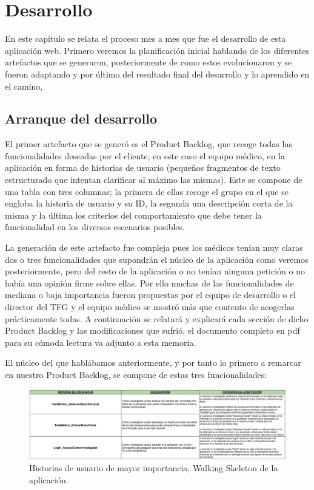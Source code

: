 \chapter{Desarrollo}

En este capitulo se relata el proceso mes a mes que fue el desarrollo de esta aplicación web. Primero veremos la planificación inicial hablando de los diferentes artefactos que se generaron, posteriormente de como estos evolucionaron y se fueron adaptando y por último del resultado final del desarrollo y lo aprendido en el camino,

\section{Arranque del desarrollo}

El primer artefacto que se generó es el Product Backlog, que recoge todas las funcionalidades deseadas por el cliente, en este caso el equipo médico, en la aplicación en forma de historias de usuario (pequeños fragmentos de texto estructurado que intentan clarificar al máximo las mismas). Este se compone de una tabla con tres columnas; la primera de ellas recoge el grupo en el que se engloba la historia de usuario y su ID, la segunda una descripción corta de la misma y la última los criterios del comportamiento que debe tener la funcionalidad en los diversos escenarios posibles.
\newline

La generación de este artefacto fue compleja pues los médicos tenían muy claras dos o tres funcionalidades que supondrán el núcleo de la aplicación como veremos posteriormente, pero del resto de la aplicación o no tenían ninguna petición o no había una opinión firme sobre ellas. Por ello muchas de las funcionalidades de mediana o baja importancia fueron propuestas por el equipo de desarrollo o el director del TFG y el equipo médico se mostró más que contento de acogerlas prácticamente todas. A continuación se relatará y explicará cada sección de dicho Product Backlog y las modificaciones que sufrió, el documento completo en pdf para su cómoda lectura va adjunto a esta memoria.
\newpage

El núcleo del que hablábamos anteriormente, y por tanto lo primero a remarcar en nuestro Product Backlog, se compone de estas tres funcionalidades:
\newline

 \begin{figure}[h]
    \centering
     \includegraphics[width=1\textwidth]{images/historiasUsuario-1.jpg}
    \caption{Historias de usuario de mayor importancia, Walking Skeleton de la aplicación.}
\end{figure}



